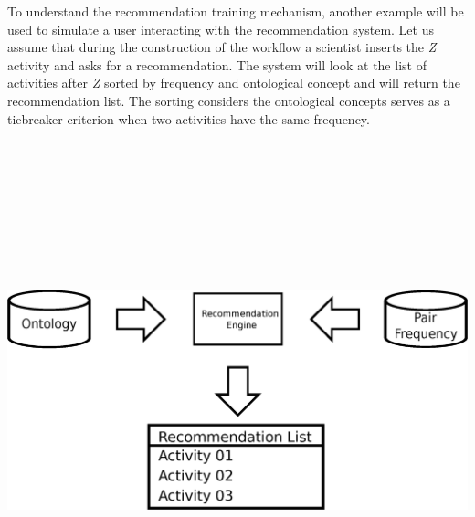 \documentclass[a0, portrait]{a0poster}
\begin{document}
\begin{multicols}{2}
To understand the recommendation training mechanism, another example will be used to simulate a user interacting with the recommendation system. Let us assume that during the construction of the workflow a scientist inserts the \emph{Z} activity and asks for a recommendation. The system will look at the list of activities after \emph{Z} sorted by frequency and ontological concept and will return the recommendation list. The sorting considers the ontological concepts serves as a tiebreaker criterion when two activities have the same frequency.
\vspace{1cm}
\begin{center}
\includegraphics[height=15cm, width=28cm]{novos/engine.eps}
\end{center}
\vspace{1cm}



\end{multicols}
\end{document}
